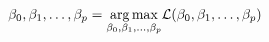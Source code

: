 \documentclass[preview]{standalone}
\begin{document}
\begin{align*}
\special{dvisvgm:raw <g id='unique000'>}\beta_0, \beta_1, \dots, \beta_p=\underset{\beta_0, \beta_1, \dots, \beta_p}{\arg\max}\mathcal{L}(\beta_0, \beta_1, \dots, \beta_p)\special{dvisvgm:raw </g>}
\end{align*}
\end{document}
